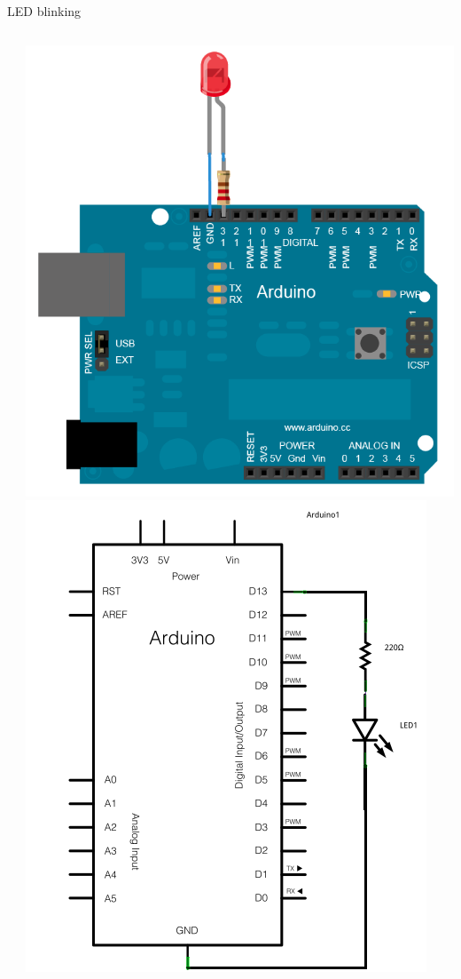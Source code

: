\documentclass[compress]{beamer}
\begin{document}
\begin{frame}[fragile]{LED blinking}
\begin{columns}
\begin{column}{0.7\linewidth}
        \end{column}
        \begin{column}{0.3\linewidth}
            \begin{center}
                \includegraphics[width=0.35\paperheight]{arduino-led}
                \includegraphics[width=0.35\paperheight]{arduino-led-schematic}
            \end{center}
        \end{column}
    \end{columns}
\end{frame}
\end{document}
